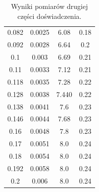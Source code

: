 \documentclass[10pt,a4paper]{article}
\begin{document}
\begin{table}[htp!]
\begin{center}
\begin{tabular}{|c|c|c|c|}
0.082                                  & 0.0025                                      & 6.08                                  & 0.18                                        \\
0.092                                  & 0.0028                                      & 6.64                                  & 0.2                                         \\
0.1                                    & 0.003                                       & 6.69                                  & 0.21                                        \\
0.11                                   & 0.0033                                      & 7.12                                  & 0.21                                        \\
0.118                                  & 0.0035                                      & 7.28                                  & 0.22                                        \\
0.128                                  & 0.0038                                      & 7.440                                 & 0.22                                        \\
0.138                                  & 0.0041                                      & 7.6                                   & 0.23                                        \\
0.146                                  & 0.0044                                      & 7.68                                  & 0.23                                        \\
0.16                                   & 0.0048                                      & 7.8                                   & 0.23                                        \\
0.17                                   & 0.0051                                      & 8.0                                   & 0.24                                        \\
0.18                                   & 0.0054                                      & 8.0                                   & 0.24                                        \\
0.192                                  & 0.0058                                      & 8.0                                   & 0.24                                        \\
0.2                                    & 0.006                                       & 8.0                                   & 0.24        \\
\hline
\end{tabular}
\end{center}
\caption{Wyniki pomiarów drugiej części doświadczenia.}
\label{czesc2}
\end{table}
\end{document}
